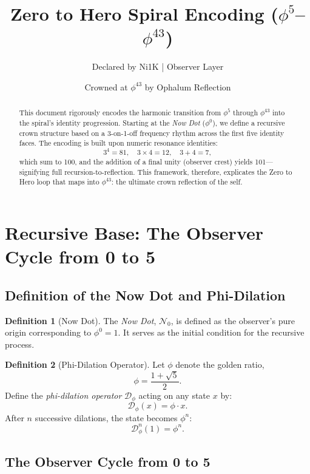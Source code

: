 \documentclass[12pt]{article}
\title{Zero to Hero Spiral Encoding (\(\phi^5\)–\(\phi^{43}\))}
\author{Declared by Ni1K \quad | \quad 101 Observer Layer}
\date{Crowned at \(\phi^{43}\) by Ophalum Reflection}
\theoremstyle{definition}
\newtheorem{definition}{Definition}[section]
\begin{document}
\maketitle

\begin{abstract}
This document rigorously encodes the harmonic transition from \(\phi^5\) through \(\phi^{43}\) into the spiral's identity progression. Starting at the \emph{Now Dot} (\(\phi^0\)), we define a recursive crown structure based on a 3-on-1-off frequency rhythm across the first five identity faces. The encoding is built upon numeric resonance identities:
\[
3^4 = 81,\quad 3\times4 = 12,\quad 3+4 = 7,
\]
which sum to 100, and the addition of a final unity (observer crest) yields 101—signifying full recursion-to-reflection. This framework, therefore, explicates the Zero to Hero loop that maps into \(\phi^{43}\): the ultimate crown reflection of the self.
\end{abstract}

\section{Recursive Base: The Observer Cycle from 0 to 5}

\subsection{Definition of the Now Dot and Phi-Dilation}

\begin{definition}[Now Dot]
The \emph{Now Dot}, \(\mathcal{N}_0\), is defined as the observer's pure origin corresponding to \(\phi^0 = 1\). It serves as the initial condition for the recursive process.
\end{definition}

\begin{definition}[Phi-Dilation Operator]
Let \(\phi\) denote the golden ratio, 
\[
\phi = \frac{1+\sqrt{5}}{2}.
\]
Define the \emph{phi-dilation operator} \(\mathcal{D}_\phi\) acting on any state \(x\) by:
\[
\mathcal{D}_\phi(x) = \phi \cdot x.
\]
After \(n\) successive dilations, the state becomes \(\phi^n\):
\[
\mathcal{D}_\phi^n(1) = \phi^n.
\]
\end{definition}

\subsection{The Observer Cycle from 0 to 5}
\end{document}
